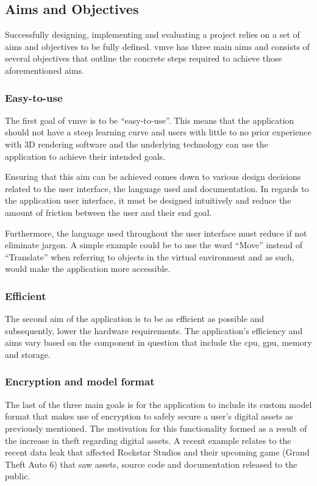 \documentclass[11pt]{article}
\begin{document}
\subsection{Aims and Objectives}
Successfully designing, implementing and evaluating a project relies on a set of
aims and objectives to be fully defined. \gls*{vmve} has three main aims and
consists of several objectives that outline the concrete steps required to
achieve those aforementioned aims.

\subsubsection{Easy-to-use}
The first goal of \gls*{vmve} is to be ``easy-to-use''. This means that the
application should not have a steep learning curve and users with little to no
prior experience with 3D rendering software and the underlying technology can
use the application to achieve their intended goals.

Ensuring that this aim can be achieved comes down to various design decisions
related to the user interface, the language used and documentation. In regards
to the application user interface, it must be designed intuitively and reduce
the amount of friction between the user and their end goal.

Furthermore, the language used throughout the user interface must reduce if not
eliminate jargon. A simple example could be to use the word ``Move'' instead of
``Translate'' when referring to objects in the virtual environment and as such,
would make the application more accessible.

\subsubsection{Efficient}
The second aim of the application is to be as efficient as possible and
subsequently, lower the hardware requirements. The application's efficiency and
aims vary based on the component in question that include the \gls*{cpu},
\gls*{gpu}, memory and storage.

\subsubsection{Encryption and model format}
The last of the three main goals is for the application to include its custom
model format that makes use of encryption to safely secure a user's digital
assets as previously mentioned. The motivation for this functionality formed as
a result of the increase in theft regarding digital assets. A recent example
relates to the recent data leak that affected Rockstar Studios and their
upcoming game (Grand Theft Auto 6) \cite{gta_leak} that saw assets, source code
and documentation released to the public.
\end{document}
